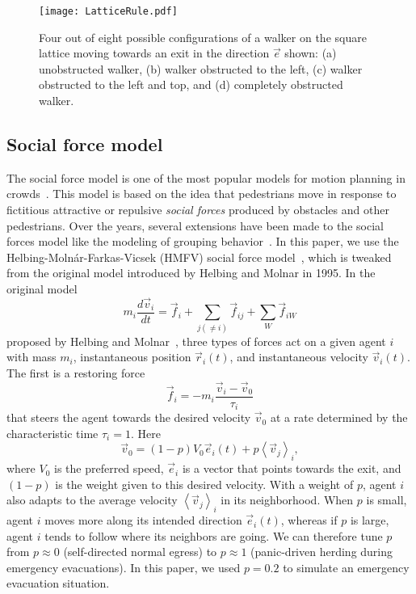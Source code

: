 \begin{figure}[!htb]
\centering
\texttt{[image: LatticeRule.pdf]}
\caption{Four out of eight possible configurations of a walker on the square lattice moving towards an exit in the direction $\vec{e}$ shown: (a) unobstructed walker, (b) walker obstructed to the left, (c) walker obstructed to the left and top, and (d) completely obstructed walker.}
\label{fig:latticeGasMovement}
\end{figure}



\subsection{Social force model}
\label{SocialForceModel}
The social force model is one of the most popular models for motion planning in crowds~\cite{Kamphuis:2004uu,Xi:2010uc,Peng:2009cc}. This model is based on the idea that pedestrians move in response to fictitious attractive or repulsive \emph{social forces} produced by obstacles and other pedestrians.  Over the years, several extensions have been made to the social forces model like the modeling of grouping behavior~\cite{Kamphuis:2004uu}. In this paper, we use the Helbing-Moln\'ar-Farkas-Vicsek (HMFV) social force model~\cite{PhysRevE.51.4282}, which is tweaked from the original model introduced by Helbing and Molnar in 1995. In the original model
\begin{equation} \label{eqn:SFeqn}
m_i \frac{d\vec{v}_i}{dt}=\vec{f}_{i}+\sum_{j(\neq i)}\vec{f}_{ij}+\sum_{W}\vec{f}_{iW}
\end{equation}
proposed by Helbing and Molnar~\cite{PhysRevE.51.4282}, three types of forces act on a given agent $i$ with mass $m_i$, instantaneous position $\vec{r}_i(t)$, and instantaneous velocity $\vec{v}_i(t)$. The first is a restoring force
\begin{equation}
\vec{f}_i = -m_i \frac{\vec{v}_i-\vec{v}_0}{\tau_i}
\end{equation}
that steers the agent towards the desired velocity $\vec{v}_0$ at a rate determined by the characteristic time $\tau_i = 1$. Here
\begin{equation}
\vec{v}_0=(1-p)V_0\vec{e}_i(t)+p\left<\vec{v}_j\right>_i,
\end{equation}
where $V_0$ is the preferred speed, $\vec{e}_i$ is a vector that points towards the exit, and $(1 - p)$ is the weight given to this desired velocity. With a weight of $p$, agent $i$ also adapts to the average velocity $\left<\vec{v}_j\right>_i$ in its neighborhood. When $p$ is small, agent $i$ moves more along its intended direction $\vec{e}_i(t)$, whereas if $p$ is large, agent $i$ tends to follow where its neighbors are going. We can therefore tune $p$ from $p \approx 0$ (self-directed normal egress) to $p \approx 1$ (panic-driven herding during emergency evacuations). In this paper, we used $p = 0.2$ to simulate an emergency evacuation situation.

